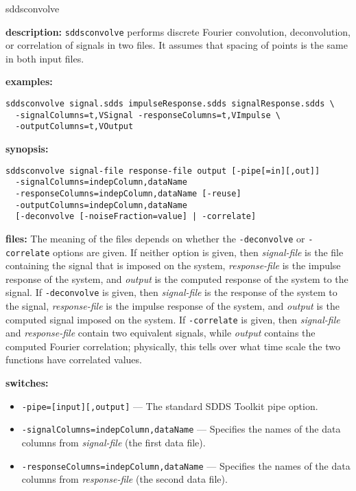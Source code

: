 \begin{sddsprog}{sddsconvolve}
  \item \textbf{description:} \verb|sddsconvolve| performs discrete Fourier convolution, deconvolution, or correlation of signals in two files. It assumes that spacing of points is the same in both input files.
  \item \textbf{examples:}
    \begin{verbatim}
sddsconvolve signal.sdds impulseResponse.sdds signalResponse.sdds \
  -signalColumns=t,VSignal -responseColumns=t,VImpulse \
  -outputColumns=t,VOutput
    \end{verbatim}
  \item \textbf{synopsis:}
    \begin{verbatim}
sddsconvolve signal-file response-file output [-pipe[=in][,out]]
  -signalColumns=indepColumn,dataName
  -responseColumns=indepColumn,dataName [-reuse]
  -outputColumns=indepColumn,dataName
  [-deconvolve [-noiseFraction=value] | -correlate]
    \end{verbatim}
  \item \textbf{files:} The meaning of the files depends on whether the \verb|-deconvolve| or \verb|-correlate| options are given. If neither option is given, then \emph{signal-file} is the file containing the signal that is imposed on the system, \emph{response-file} is the impulse response of the system, and \emph{output} is the computed response of the system to the signal. If \verb|-deconvolve| is given, then \emph{signal-file} is the response of the system to the signal, \emph{response-file} is the impulse response of the system, and \emph{output} is the computed signal imposed on the system. If \verb|-correlate| is given, then \emph{signal-file} and \emph{response-file} contain two equivalent signals, while \emph{output} contains the computed Fourier correlation; physically, this tells over what time scale the two functions have correlated values.
  \item \textbf{switches:}
    \begin{itemize}
      \item \verb|-pipe=[input][,output]| --- The standard SDDS Toolkit pipe option.
      \item \verb|-signalColumns=indepColumn,dataName| --- Specifies the names of the data columns from \emph{signal-file} (the first data file).
      \item \verb|-responseColumns=indepColumn,dataName| --- Specifies the names of the data columns from \emph{response-file} (the second data file).

\end{itemize}
\end{sddsprog}
